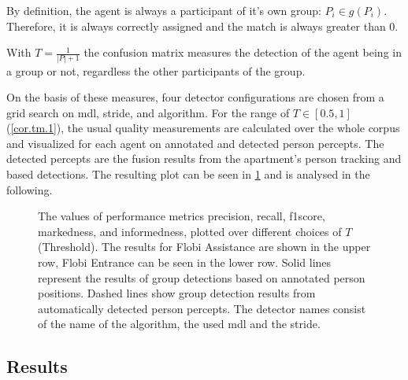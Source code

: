 By definition, the agent is always a participant of it's own group: \(P_i \in g(P_i)\).
Therefore, it is always correctly assigned and the match is always greater than 0.
\begin{corollary}
    \label{cor.tm.2}
    With \(T=\frac{1}{|P|+1}\) the \gls{confusion matrix} measures the detection of the agent being in a group or not, regardless the other participants of the group.
\end{corollary}
On the basis of these measures, four detector configurations are chosen from a grid search on \gls{mdl}, \gls{stride}, and algorithm.
For the range of \(T \in [0.5,1]\) (\cref{cor.tm.1}), the usual quality measurements are calculated over the whole corpus and visualized for each agent on annotated and detected person percepts.
The detected percepts are the fusion results from the \gls{apartment}'s person tracking and  based detections.
The resulting plot can be seen in \cref{fig:ffm-ffm} and is analysed in the following.
\begin{figure}[tbhp]
    \centering
    
    \caption[F-Formation detection quality.]{\label{fig:ffm-ffm}
    The values of performance metrics \gls{precision}, \gls{recall}, \gls{f1score}, \gls{markedness}, and \gls{informedness}, plotted over different choices of \(T\) (Threshold).
    The results for \gls{Flobi Assistance} are shown in the upper row, \gls{Flobi Entrance} can be seen in the lower row.
    Solid lines represent the results of group detections based on annotated person positions.
    Dashed lines show group detection results from automatically detected person percepts.
    The detector names consist of the name of the algorithm, the used \gls{mdl} and the \gls{stride}.
    }
\end{figure}

\subsection{Results}

